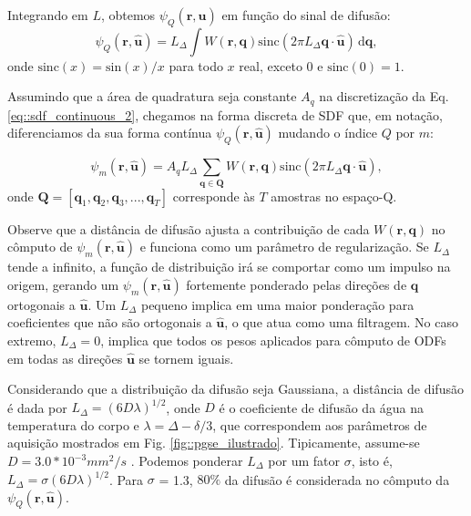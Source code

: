\documentclass[
    12pt,                %
    oneside,            %
    a4paper,            %
    english,            %
    french,                %
    spanish,            %
    brazil                %
    ]{abntex2}
\begin{document}
Integrando em $L$, obtemos $\psi_Q(\mathbf{r}, \mathbf{\hat{u}})$ em função do sinal de difusão: 
\begin{equation}
\label{eq::sdf_continuous_2}
    \psi_Q(\mathbf{r}, \mathbf{\hat{u}}) =
    L_{\Delta} \int \! W(\mathbf{r}, \mathbf{q}) \text{sinc}(2\pi L_{\Delta} \mathbf{q} \cdot \mathbf{\hat{u}}) \,\mathrm{d}\mathbf{q} ,
\end{equation}
onde $\text{sinc}(x) = \text{sin}(x)/x$ para todo $x$ real, exceto $0$ e $\text{sinc}(0) = 1$.

Assumindo que a área de quadratura seja constante $A_q$ na discretização da Eq. \ref{eq::sdf_continuous_2}, chegamos na forma discreta de SDF que, em notação, diferenciamos da sua forma contínua $\psi_Q(\mathbf{r}, \mathbf{\hat{u}})$ mudando o índice $Q$ por $m$:


\begin{equation}
\label{eq::sdf_discrete_1}
    \psi_m(\mathbf{r}, \mathbf{\hat{u}}) =
     A_qL_{\Delta}\sum_{\mathbf{q} \in \mathbf{Q}} W(\mathbf{r}, \mathbf{q})\text{sinc}(2\pi L_{\Delta} \mathbf{q}\cdot\mathbf{\hat{u}}),
\end{equation}
onde $\mathbf{Q}= [
\mathbf{q}_1,
\mathbf{q}_2,
\mathbf{q}_3, ...,
\mathbf{q}_T
]$ corresponde às $T$ amostras no espaço-Q.

Observe que a distância de difusão ajusta a contribuição de cada $W(\mathbf{r}, \mathbf{q})$ no cômputo de $\psi_m(\mathbf{r}, \mathbf{\hat{u}})$ e funciona como um parâmetro de regularização. Se $L_{\Delta}$ tende a infinito, a função de distribuição irá se comportar como um impulso na origem, gerando um $\psi_m(\mathbf{r}, \mathbf{\hat{u}})$ fortemente ponderado pelas direções de $\mathbf{q}$ ortogonais a $\mathbf{\hat{u}}$. Um $L_{\Delta}$ pequeno implica em uma maior ponderação para coeficientes que não são ortogonais a $\mathbf{\hat{u}}$, o que atua como uma filtragem. No caso extremo, $L_{\Delta} = 0$, implica que todos os pesos aplicados para cômputo de ODFs em todas as direções $\mathbf{\hat{u}}$ se tornem iguais.

Considerando que a distribuição da difusão seja Gaussiana, a distância de difusão é dada por $L_{\Delta}=(6D\lambda)^{1/2}$, onde $D$ é o coeficiente de difusão da água na temperatura do corpo e $\lambda = \Delta - \delta/3$, que correspondem aos parâmetros de aquisição mostrados em Fig. \ref{fig::pgse_ilustrado}. 
Tipicamente, assume-se $D = 3.0*10^{-3} mm^2/s$ \cite{yeh2019_DSI}. Podemos ponderar $L_{\Delta}$ por um fator $\sigma$, isto é, $L_{\Delta} = \sigma(6D\lambda)^{1/2}$. Para $\sigma$ = 1.3, $80\%$ da difusão é considerada no cômputo da $\psi_Q(\mathbf{r}, \mathbf{\hat{u}})$.
\end{document}
